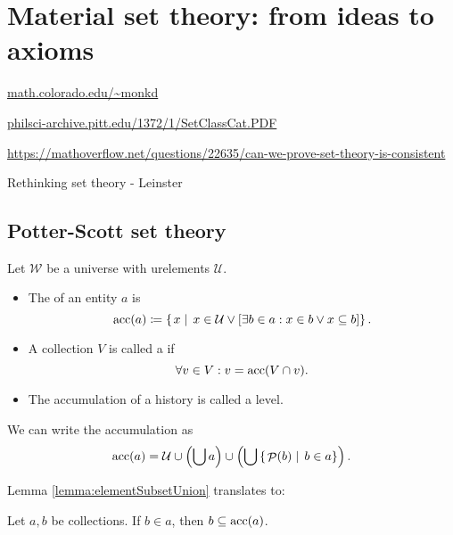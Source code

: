 \chapter{Material set theory: from ideas to axioms}
\url{math.colorado.edu/~monkd}

\url{philsci-archive.pitt.edu/1372/1/SetClassCat.PDF}

\url{https://mathoverflow.net/questions/22635/can-we-prove-set-theory-is-consistent}

Rethinking set theory - Leinster
\section{Potter-Scott set theory}
\begin{definition}
Let $\mathcal{W}$ be a universe with urelements $\mathcal{U}$.
\begin{itemize}
\item The  of an entity $a$ is
\[ \operatorname{acc}(a) \coloneqq \left\{\left. x \;\right|\; x\in \mathcal{U} \lor \left[\exists b\in a: x\in b \lor x\subseteq b\right] \right\}. \]
\item A collection $V$ is called a  if
\[ \forall v\in V: v = \operatorname{acc}(V\cap v). \]
\item The accumulation of a history is called a level.
\end{itemize}
\end{definition}

We can write the accumulation as
\[ \operatorname{acc}(a) = \mathcal{U}\cup \left(\bigcup a\right) \cup \left(\bigcup\left\{\left. \mathop{\mathcal{P}}(b) \;\right|\; b\in a \right\}\right). \]

Lemma \ref{lemma:elementSubsetUnion} translates to:
\begin{lemma} \label{lemma:elementsSubsetAccumulation}
Let $a,b$ be collections. If $b\in a$, then $b\subseteq \operatorname{acc}(a)$.
\end{lemma}

